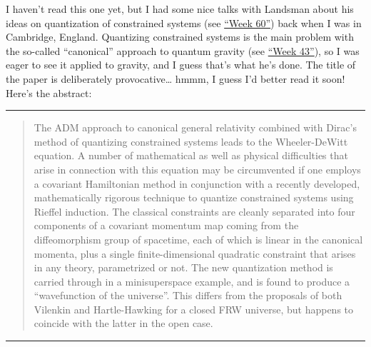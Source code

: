 \documentclass{article}
\def\tightlist{}
\renewcommand{\texttt}[1]{%
  \begingroup
  \ttfamily
  \begingroup\lccode`~=`/\lowercase{\endgroup\def~}{/\discretionary{}{}{}}%
  \begingroup\lccode`~=`[\lowercase{\endgroup\def~}{[\discretionary{}{}{}}%
  \begingroup\lccode`~=`.\lowercase{\endgroup\def~}{.\discretionary{}{}{}}%
  \catcode`/=\active\catcode`[=\active\catcode`.=\active
  \scantokens{#1\noexpand}%
  \endgroup
}
\begin{document}

I haven't read this one yet, but I had some nice talks with Landsman
about his ideas on quantization of constrained systems (see
\protect\hyperlink{week60}{``Week 60''}) back when I was in Cambridge,
England. Quantizing constrained systems is the main problem with the
so-called ``canonical'' approach to quantum gravity (see
\protect\hyperlink{week43}{``Week 43''}), so I was eager to see it
applied to gravity, and I guess that's what he's done. The title of the
paper is deliberately provocative\ldots{} hmmm, I guess I'd better read
it soon! Here's the abstract:

\begin{center}\rule{0.5\linewidth}{0.5pt}\end{center}

\begin{quote}
The ADM approach to canonical general relativity combined with Dirac's
method of quantizing constrained systems leads to the Wheeler-DeWitt
equation. A number of mathematical as well as physical difficulties that
arise in connection with this equation may be circumvented if one
employs a covariant Hamiltonian method in conjunction with a recently
developed, mathematically rigorous technique to quantize constrained
systems using Rieffel induction. The classical constraints are cleanly
separated into four components of a covariant momentum map coming from
the diffeomorphism group of spacetime, each of which is linear in the
canonical momenta, plus a single finite-dimensional quadratic constraint
that arises in any theory, parametrized or not. The new quantization
method is carried through in a minisuperspace example, and is found to
produce a ``wavefunction of the universe''. This differs from the
proposals of both Vilenkin and Hartle-Hawking for a closed FRW universe,
but happens to coincide with the latter in the open case.
\end{quote}

\begin{center}\rule{0.5\linewidth}{0.5pt}\end{center}

\end{document}
